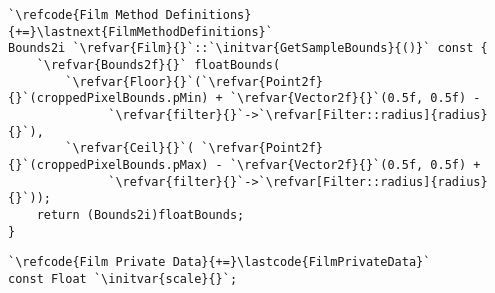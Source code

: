 \begin{lstlisting}
`\refcode{Film Method Definitions}{+=}\lastnext{FilmMethodDefinitions}`
Bounds2i `\refvar{Film}{}`::`\initvar{GetSampleBounds}{()}` const {
    `\refvar{Bounds2f}{}` floatBounds(
        `\refvar{Floor}{}`(`\refvar{Point2f}{}`(croppedPixelBounds.pMin) + `\refvar{Vector2f}{}`(0.5f, 0.5f) -
              `\refvar{filter}{}`->`\refvar[Filter::radius]{radius}{}`),
        `\refvar{Ceil}{}`( `\refvar{Point2f}{}`(croppedPixelBounds.pMax) - `\refvar{Vector2f}{}`(0.5f, 0.5f) +
              `\refvar{filter}{}`->`\refvar[Filter::radius]{radius}{}`));
    return (Bounds2i)floatBounds;
}
\end{lstlisting}

\begin{lstlisting}
`\refcode{Film Private Data}{+=}\lastcode{FilmPrivateData}`
const Float `\initvar{scale}{}`;
\end{lstlisting}